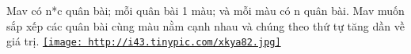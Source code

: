 Mav có n*c quân bài; mỗi quân bài 1 màu; và mỗi màu có n quân bài. Mav  muốn sắp xếp các quân bài cùng màu nằm cạnh nhau và chúng theo thứ tự  tăng dần về giá trị.  \href{http://tinypic.com}{
\texttt{[image: http://i43.tinypic.com/xkya82.jpg]}}